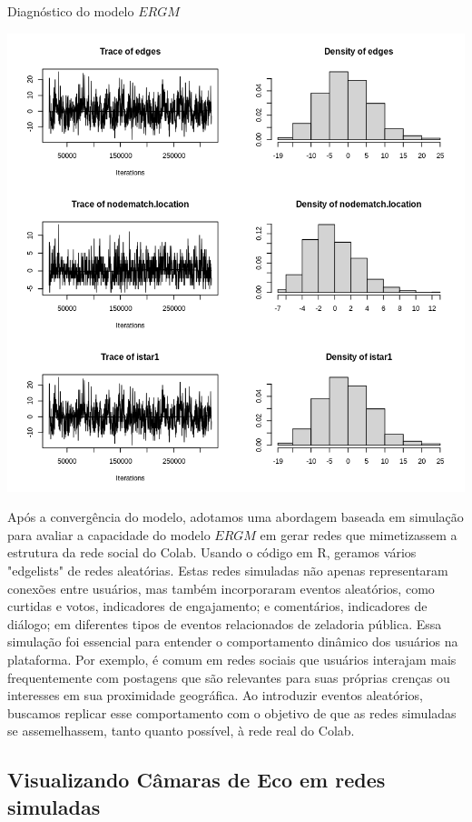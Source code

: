 \begin{quadro}[!htb]
	\caption{Diagnóstico do modelo $ERGM$}
	\label{fig:ergm_diagnostics}
	\centering
	\includegraphics[scale=0.5]{images/ergm_diagnostics.png}
	\fautor
\end{quadro}

Após a convergência do modelo, adotamos uma abordagem baseada em simulação para avaliar a capacidade do modelo $ERGM$ em gerar redes que mimetizassem a estrutura da rede social do Colab. Usando o código em R, geramos vários "edgelists" de redes aleatórias. Estas redes simuladas não apenas representaram conexões entre usuários, mas também incorporaram eventos aleatórios, como curtidas e votos, indicadores de engajamento; e comentários, indicadores de diálogo; em diferentes tipos de eventos relacionados de zeladoria pública. Essa simulação foi essencial para entender o comportamento dinâmico dos usuários na plataforma. Por exemplo, é comum em redes sociais que usuários interajam mais frequentemente com postagens que são relevantes para suas próprias crenças ou interesses em sua proximidade geográfica. Ao introduzir eventos aleatórios, buscamos replicar esse comportamento com o objetivo de que as redes simuladas se assemelhassem, tanto quanto possível, à rede real do Colab.

\subsection{Visualizando Câmaras de Eco em redes simuladas}

